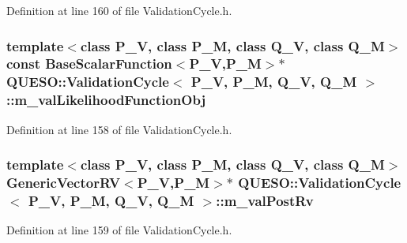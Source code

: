 Definition at line 160 of file Validation\-Cycle.\-h.

\hypertarget{class_q_u_e_s_o_1_1_validation_cycle_a18afcde29c5ba9f4b7d9db9519166d45}{
\subsubsection[{m\-\_\-val\-Likelihood\-Function\-Obj}]{\setlength{\rightskip}{0pt plus 5cm}template$<$class P\-\_\-\-V, class P\-\_\-\-M, class Q\-\_\-\-V, class Q\-\_\-\-M$>$ const {\bf Base\-Scalar\-Function}$<$P\-\_\-\-V,P\-\_\-\-M$>$$\ast$ {\bf Q\-U\-E\-S\-O\-::\-Validation\-Cycle}$<$ P\-\_\-\-V, P\-\_\-\-M, Q\-\_\-\-V, Q\-\_\-\-M $>$\-::m\-\_\-val\-Likelihood\-Function\-Obj\hspace{0.3cm}{\ttfamily [private]}}}\label{class_q_u_e_s_o_1_1_validation_cycle_a18afcde29c5ba9f4b7d9db9519166d45}


Definition at line 158 of file Validation\-Cycle.\-h.

\hypertarget{class_q_u_e_s_o_1_1_validation_cycle_a196610836330a456a21c4f3b6ec56883}{
\subsubsection[{m\-\_\-val\-Post\-Rv}]{\setlength{\rightskip}{0pt plus 5cm}template$<$class P\-\_\-\-V, class P\-\_\-\-M, class Q\-\_\-\-V, class Q\-\_\-\-M$>$ {\bf Generic\-Vector\-R\-V}$<$P\-\_\-\-V,P\-\_\-\-M$>$$\ast$ {\bf Q\-U\-E\-S\-O\-::\-Validation\-Cycle}$<$ P\-\_\-\-V, P\-\_\-\-M, Q\-\_\-\-V, Q\-\_\-\-M $>$\-::m\-\_\-val\-Post\-Rv\hspace{0.3cm}{\ttfamily [private]}}}\label{class_q_u_e_s_o_1_1_validation_cycle_a196610836330a456a21c4f3b6ec56883}


Definition at line 159 of file Validation\-Cycle.\-h.

